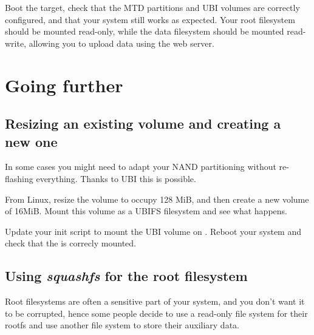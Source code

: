 Boot the target, check that the MTD partitions and UBI volumes are
correctly configured, and that your system still works as
expected. Your root filesystem should be mounted read-only, while the
data filesystem should be mounted read-write, allowing you to upload
data using the web server.


\section{Going further}

\subsection{Resizing an existing volume and creating a new one}

In some cases you might need to adapt your NAND partitioning without
re-flashing everything. Thanks to UBI this is possible.

From Linux, resize the  volume to occupy 128 MiB,
and then create a new  volume of 16MiB. Mount this
volume as a UBIFS filesystem and see what happens.

Update your init script to mount the UBI  volume on .
Reboot your system and check that the  is correcly mounted.

%
%

\subsection{Using {\em squashfs} for the root filesystem}

Root filesystems are often a sensitive part of your system, and you don't
want it to be corrupted, hence some people decide to use a read-only
file system for their rootfs and use another file system to store their
auxiliary data.


